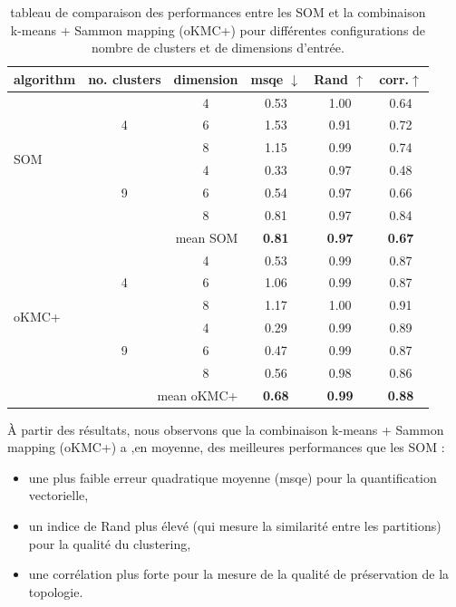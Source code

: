 \documentclass[12pt,a4paper]{report}
\begin{document}
\begin{table}[H]
\centering
\begin{tabular}{lccccc}
\toprule
algorithm & no. clusters & dimension & msqe $\downarrow$ & Rand $\uparrow$ & corr.$\uparrow$ \\
\midrule

\multirow{6}{*}{SOM}
& \multirow{3}{*}{4} 
    & 4 & 0.53 & 1.00 & 0.64 \\
&   & 6 & 1.53 & 0.91 & 0.72 \\
&   & 8 & 1.15 & 0.99 & 0.74 \\
\cmidrule(lr){2-6}
& \multirow{3}{*}{9} 
    & 4 & 0.33 & 0.97 & 0.48 \\
&   & 6 & 0.54 & 0.97 & 0.66 \\
&   & 8 & 0.81 & 0.97 & 0.84 \\
\midrule
\multicolumn{3}{r}{mean SOM} 
& \textbf{0.81} & \textbf{0.97} & \textbf{0.67} \\
\midrule

\multirow{6}{*}{oKMC+}
& \multirow{3}{*}{4} 
    & 4 & 0.53 & 0.99 & 0.87 \\
&   & 6 & 1.06 & 0.99 & 0.87 \\
&   & 8 & 1.17 & 1.00 & 0.91 \\
\cmidrule(lr){2-6}
& \multirow{3}{*}{9} 
    & 4 & 0.29 & 0.99 & 0.89 \\
&   & 6 & 0.47 & 0.99 & 0.87 \\
&   & 8 & 0.56 & 0.98 & 0.86 \\
\midrule
\multicolumn{3}{r}{mean oKMC+} 
& \textbf{0.68} & \textbf{0.99} & \textbf{0.88} \\
\bottomrule

\end{tabular}
\caption{tableau de comparaison des performances entre les SOM et la combinaison k-means + Sammon mapping (oKMC+) pour différentes configurations de nombre de clusters et de dimensions d'entrée.}
\label{tab:comparison_som_kmeans}
\end{table}

À partir des résultats, nous observons que la combinaison k-means + Sammon mapping (oKMC+) a ,en moyenne, des meilleures performances que les SOM :
\begin{itemize}
\item une plus faible erreur quadratique moyenne (msqe) pour la quantification vectorielle, 
\item un indice de Rand plus élevé (qui mesure la similarité entre les partitions) pour la qualité du clustering,
\item une corrélation plus forte pour la mesure de la qualité de préservation de la topologie. 
\end{itemize}
\end{document}
